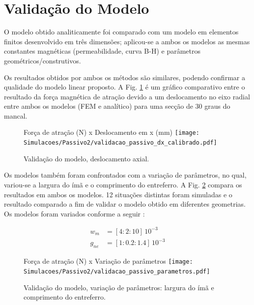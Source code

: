 \section{Validação do Modelo}

O modelo obtido analiticamente foi comparado com um modelo em elementos finitos desenvolvido em três dimensões; aplicou-se a ambos os modelos as mesmas constantes magnéticas (permeabilidade, curva B-H) e parâmetros geométricos/construtivos.

Os resultados obtidos por ambos os métodos são similares, podendo confirmar a qualidade do modelo linear proposto.  A Fig. \ref{fig:validacao_passivo_dx_calibrado} é um gráfico comparativo entre o resultado da força magnética de atração devido a um deslocamento no eixo radial entre ambos os modelos (FEM e analítico) para uma secção de 30 graus do mancal.

\begin{figure}[th!]
	\centering
	Força de atração (N) x Deslocamento em x (mm)
	\texttt{[image: Simulacoes/Passivo2/validacao\_passivo\_dx\_calibrado.pdf]}
	\caption{Validação do modelo, deslocamento axial.}
	\label{fig:validacao_passivo_dx_calibrado}
\end{figure}

Os modelos também foram confrontados com a variação de parâmetros, no qual, variou-se a largura do ímã e o comprimento do entreferro. A Fig. \ref{fig:validacao_passivo_parametros} compara os resultados em ambos os modelos. 12 situações distintas foram simuladas e o resultado comparado a fim de validar o modelo obtido em diferentes geometrias. Os modelos foram variados conforme a seguir :

\begin{align}
	w_m &= [4:2:10 ] \, 10^{-3} \\
	g_{ne} & = [1:0.2:1.4] \, 10^{-3}
\end{align}




\begin{figure}[th!]
	\centering
	Força de atração (N) x Variação de parâmetros
	\texttt{[image: Simulacoes/Passivo2/validacao\_passivo\_parametros.pdf]}
	\caption{Validação do modelo, variação de parâmetros: largura do ímã e comprimento do entreferro.}
	\label{fig:validacao_passivo_parametros}
\end{figure} 

